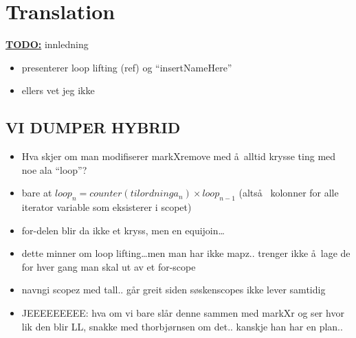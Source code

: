 \chapter{Translation}


\textbf{\underline{\LARGE TODO:}} innledning
\begin{itemize}
  \item presenterer loop lifting (ref) og ``insertNameHere''
  \item ellers vet jeg ikke
\end{itemize}





\section{VI DUMPER HYBRID}
\begin{itemize}
  \item Hva skjer om man modifiserer markXremove med \aa~alltid krysse ting med
  noe ala ``loop''?
  \item bare at $loop_{n} = counter(tilordninga_{n}) \times loop_{n-1}$
  (alts\aa~ kolonner for alle iterator variable som eksisterer i scopet)
  \item for-delen blir da ikke et kryss, men en equijoin\ldots
  \item dette minner om loop lifting\ldots men man har ikke mapz.. trenger ikke
  \aa~lage de for hver gang man skal ut av et for-scope
  \item navngi scopez med tall.. g\aa r greit siden s\o skenscopes ikke lever
  samtidig
  \item JEEEEEEEEE: hva om vi bare sl\aa r denne sammen med markXr og ser hvor lik den blir LL, snakke med
  thorbj\o rnsen om det.. kanskje han har en plan..
\end{itemize}
